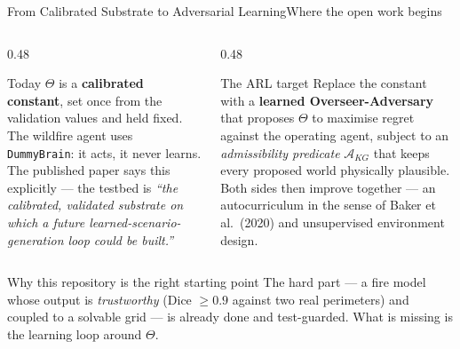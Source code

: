 \documentclass[aspectratio=169,9pt]{beamer}
\newcommand{\code}[1]{{\small\texttt{#1}}}
\newcommand{\gold}[1]{{\color{cslaeaglegold}\textbf{#1}}}
\begin{document}
\begin{frame}{From Calibrated Substrate to Adversarial Learning}{Where the open work begins}
  \begin{columns}[T,onlytextwidth]
    \begin{column}{0.48\textwidth}
      \begin{block}{Today}
        \small
        $\Theta$ is a \gold{calibrated constant}, set once from the
        validation values and held fixed. The wildfire agent uses
        \code{DummyBrain}: it acts, it never learns.
        \vskip3pt
        The published paper says this explicitly --- the testbed is
        \emph{``the calibrated, validated substrate on which a future
        learned-scenario-generation loop could be built.''}
      \end{block}
    \end{column}
    \begin{column}{0.48\textwidth}
      \begin{alertblock}{The ARL target}
        \small
        Replace the constant with a \gold{learned Overseer-Adversary} that
        proposes $\Theta$ to maximise regret against the operating agent,
        subject to an \emph{admissibility predicate} $\mathcal{A}_{KG}$ that
        keeps every proposed world physically plausible.
        \vskip3pt
        Both sides then improve together --- an autocurriculum in the sense
        of Baker et al.\ (2020) and unsupervised environment design.
      \end{alertblock}
    \end{column}
  \end{columns}
  \vskip4pt
  \begin{block}{Why this repository is the right starting point}
    \small The hard part --- a fire model whose output is
    \emph{trustworthy} (Dice $\ge 0.9$ against two real perimeters) and
    coupled to a solvable grid --- is already done and test-guarded. What is
    missing is the learning loop around $\Theta$.
  \end{block}
\end{frame}
\end{document}
